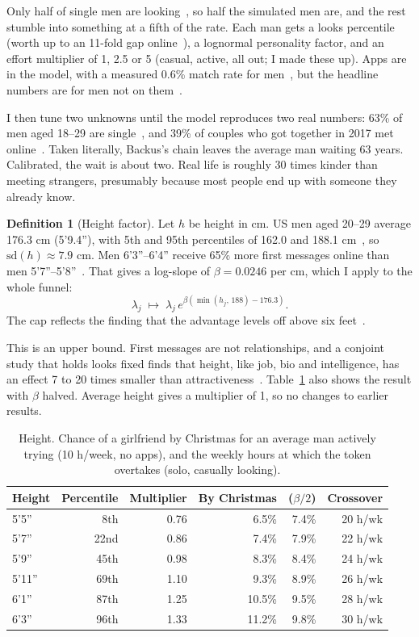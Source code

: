 \documentclass[11pt]{article}
\theoremstyle{definition}
\newtheorem{definition}{Definition}[section]
\theoremstyle{plain}
\begin{document}
Only half of single men are looking~\cite{pew23}, so half the simulated men are, and the rest stumble into something at a fifth of the rate. Each man gets a looks percentile (worth up to an 11-fold gap online~\cite{okc}), a lognormal personality factor, and an effort multiplier of 1, 2.5 or 5 (casual, active, all out; I made these up). Apps are in the model, with a measured 0.6\% match rate for men~\cite{tyson}, but the headline numbers are for men not on them~\cite{pewod}.

I then tune two unknowns until the model reproduces two real numbers: 63\% of men aged 18--29 are single~\cite{pew23}, and 39\% of couples who got together in 2017 met online~\cite{hcmst}. Taken literally, Backus's chain leaves the average man waiting 63 years. Calibrated, the wait is about two. Real life is roughly 30 times kinder than meeting strangers, presumably because most people end up with someone they already know.

\begin{definition}[Height factor]
Let $h$ be height in cm. US men aged 20--29 average 176.3 cm (5'9.4''), with 5th and 95th percentiles of 162.0 and 188.1 cm~\cite{nhanes}, so $\mathrm{sd}(h) \approx 7.9$ cm. Men 6'3''--6'4'' receive 65\% more first messages online than men 5'7''--5'8''~\cite{hitsch}. That gives a log-slope of $\beta = 0.0246$ per cm, which I apply to the whole funnel:
\[
\lambda_j \;\mapsto\; \lambda_j\, e^{\beta(\min(h_j,\,188) - 176.3)}.
\]
The cap reflects the finding that the advantage levels off above six feet~\cite{hensley}.
\end{definition}

This is an upper bound. First messages are not relationships, and a conjoint study that holds looks fixed finds that height, like job, bio and intelligence, has an effect 7 to 20 times smaller than attractiveness~\cite{witmer}. Table~\ref{tab:height} also shows the result with $\beta$ halved. Average height gives a multiplier of 1, so no changes to earlier results.

\begin{table}[!htbp]
\centering\small
\caption{Height. Chance of a girlfriend by Christmas for an average man actively trying (10 h/week, no apps), and the weekly hours at which the token overtakes (solo, casually looking).}
\label{tab:height}
\begin{tabular}{lrrrrr}
\toprule
Height & Percentile & Multiplier & By Christmas & ($\beta/2$) & Crossover \\
\midrule
5'5'' & 8th & 0.76 & 6.5\% & 7.4\% & 20 h/wk \\
5'7'' & 22nd & 0.86 & 7.4\% & 7.9\% & 22 h/wk \\
5'9'' & 45th & 0.98 & 8.3\% & 8.4\% & 24 h/wk \\
5'11'' & 69th & 1.10 & 9.3\% & 8.9\% & 26 h/wk \\
6'1'' & 87th & 1.25 & 10.5\% & 9.5\% & 28 h/wk \\
6'3'' & 96th & 1.33 & 11.2\% & 9.8\% & 30 h/wk \\
\bottomrule
\end{tabular}
\end{table}
\end{document}
